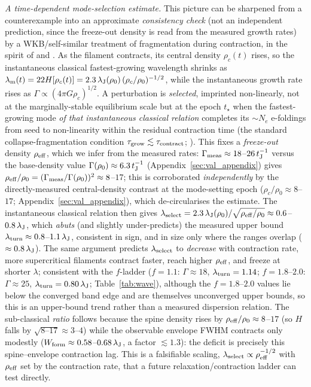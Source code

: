 \documentclass[usenatbib,twoside,twocolumn]{mnras}
\begin{document}
\emph{A time-dependent mode-selection estimate.} This picture can be sharpened from a counterexample into an approximate \emph{consistency check} (not an independent prediction, since the freeze-out density is read from the measured growth rates) by a WKB/self-similar treatment of fragmentation during contraction, in the spirit of \citet{Larson1985} and \citet{Clarke2016,Clarke2017}. As the filament contracts, its central density $\rho_c(t)$ rises, so the instantaneous classical fastest-growing wavelength shrinks as $\lambda_{\rm m}(t)=22H[\rho_c(t)]=2.3\,\lambda_{\rm J}(\rho_0)\,(\rho_c/\rho_0)^{-1/2}$, while the instantaneous growth rate rises as $\Gamma\propto(4\pi G\rho_c)^{1/2}$. A perturbation is \emph{selected}, imprinted non-linearly, not at the marginally-stable equilibrium scale but at the epoch $t_\star$ when the fastest-growing mode \emph{of that instantaneous classical relation} completes its $\sim\!N_e$ e-foldings from seed to non-linearity within the residual contraction time (the standard collapse-fragmentation condition $\tau_{\rm grow}\lesssim\tau_{\rm contract}$; \citealt{Larson1985}). This fixes a \emph{freeze-out} density $\rho_{\rm eff}$, which we infer from the measured rates: $\Gamma_{\rm meas}\approx18$--$26\,t_{\rm J}^{-1}$ versus the base-density value $\Gamma(\rho_0)\approx6.3\,t_{\rm J}^{-1}$ (Appendix~\ref{sec:val_appendix}) gives $\rho_{\rm eff}/\rho_0=(\Gamma_{\rm meas}/\Gamma(\rho_0))^2\approx8$--$17$; this is corroborated \emph{independently} by the directly-measured central-density contrast at the mode-setting epoch ($\rho_c/\rho_0\approx8$--$17$; Appendix~\ref{sec:val_appendix}), which de-circularises the estimate. The instantaneous classical relation then gives $\lambda_{\rm select}=2.3\,\lambda_{\rm J}(\rho_0)/\sqrt{\rho_{\rm eff}/\rho_0}\approx0.6$--$0.8\,\lambda_{\rm J}$, which \emph{abuts} (and slightly under-predicts) the measured upper bound $\lambda_{\rm turn}\approx0.8$--$1.1\,\lambda_{\rm J}$, consistent in sign, and in size only where the ranges overlap ($\approx0.8\,\lambda_{\rm J}$). The same argument predicts $\lambda_{\rm select}$ to \emph{decrease} with contraction rate, more supercritical filaments contract faster, reach higher $\rho_{\rm eff}$, and freeze at shorter $\lambda$; consistent with the $f$-ladder ($f=1.1$: $\Gamma\approx18$, $\lambda_{\rm turn}=1.14$; $f=1.8$--$2.0$: $\Gamma\approx25$, $\lambda_{\rm turn}=0.80\,\lambda_{\rm J}$; Table~\ref{tab:wave}), although the $f=1.8$--$2.0$ values lie below the converged band edge and are themselves unconverged upper bounds, so this is an upper-bound trend rather than a measured dispersion relation. The sub-classical \emph{ratio} follows because the spine density rises by $\rho_{\rm eff}/\rho_0\approx8$--$17$ (so $H$ falls by $\sqrt{8\text{--}17}\approx3$--$4$) while the observable envelope FWHM contracts only modestly ($W_{\rm form}\approx0.58$--$0.68\,\lambda_{\rm J}$, a factor $\lesssim1.3$): the deficit is precisely this spine--envelope contraction lag. This is a falsifiable scaling, $\lambda_{\rm select}\propto\rho_{\rm eff}^{-1/2}$ with $\rho_{\rm eff}$ set by the contraction rate, that a future relaxation/contraction ladder can test directly.
\end{document}
